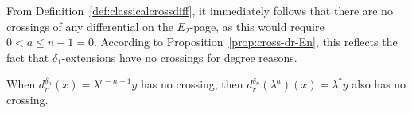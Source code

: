 \documentclass[12pt]{amsart}
\numberwithin{equation}{section}
\begin{document}
\begin{remark} \label{nocrossE2}
    From Definition~\ref{def:classicalcrossdiff}, it immediately follows that there are no crossings of any differential on the $E_2$-page, as this would require $0< a \le n-1 = 0$. According to Proposition~\ref{prop:cross-dr-En}, this reflects the fact that $\delta_1$-extensions have no crossings for degree reasons.
\end{remark}

\begin{remark}
    When $d_r^{\delta_n}(x) = \lambda^{r-n-1}y$ has no crossing, then 
    $d_r^{\delta_n}(\lambda^a)(x) = \lambda^?y$ also has no crossing.
\end{remark}
\end{document}

